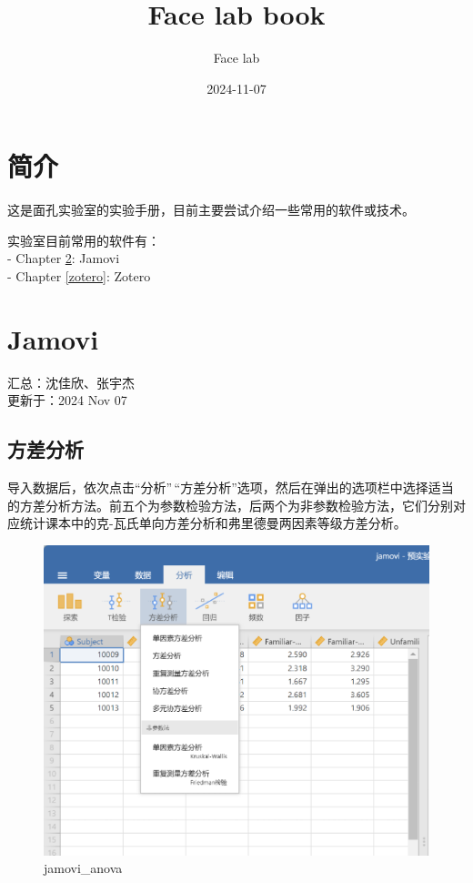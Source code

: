 \documentclass[
]{book}
\title{Face lab book}
\author{Face lab}
\date{2024-11-07}
\begin{document}
\maketitle

{
\setcounter{tocdepth}{1}
\tableofcontents
}
\chapter{简介}\label{ux7b80ux4ecb}

这是面孔实验室的实验手册，目前主要尝试介绍一些常用的软件或技术。

实验室目前常用的软件有：\\
- Chapter \ref{jamovi}: Jamovi\\
- Chapter \ref{zotero}: Zotero

\chapter{Jamovi}\label{jamovi}

汇总：沈佳欣、张宇杰\\
更新于：2024 Nov 07

\section{方差分析}\label{ux65b9ux5deeux5206ux6790}

导入数据后，依次点击``分析''\,``方差分析''选项，然后在弹出的选项栏中选择适当的方差分析方法。前五个为参数检验方法，后两个为非参数检验方法，它们分别对应统计课本中的克-瓦氏单向方差分析和弗里德曼两因素等级方差分析。

\begin{figure}
\centering
\includegraphics{img/jamovi/anova.png}
\caption{jamovi\_anova}
\end{figure}
\end{document}
